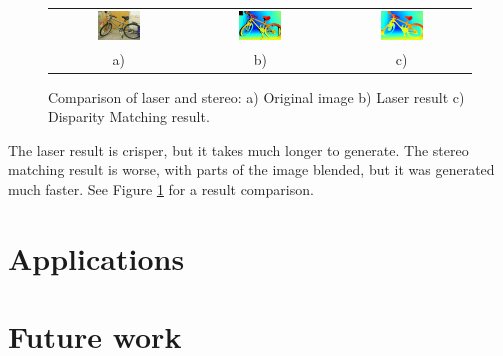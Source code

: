 \documentclass[11pt,fleqn]{article}
\begin{document}
\begin{figure}[!ht]
\centering
\setlength{}
\begin{tabular}{ccc}
\includegraphics[width=0.33\textwidth]{images/_im0-600.jpg} &
\includegraphics[width=0.33\textwidth]{images/disp0GT-600.jpg} &
\includegraphics[width=0.33\textwidth]{images/_disp-600.jpg} \\[2pt]
a) & b) & c) \\
\end{tabular}
\caption[Comparison of laser and stereo]{Comparison of laser and stereo: a) Original image b) Laser result c) Disparity Matching result.}
\label{fig:result1}
\end{figure}

The laser result is crisper, but it takes much longer to generate. The stereo matching result is worse, with parts of the image blended, but it was generated much faster. See Figure \ref{fig:result1} for a result comparison.


\section{Applications}

\section{Future work}
\end{document}
